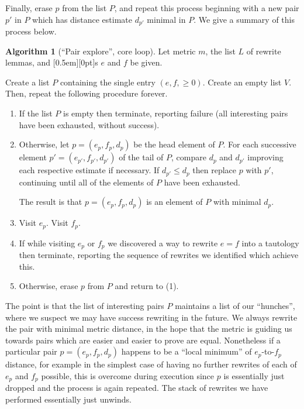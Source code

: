 \documentclass[a4paper]{article}
\theoremstyle{plain}
\theoremstyle{definition}
\newtheorem{alg}[theorem]{Algorithm}
\newcommand{\xx}[1]{{\colorbox{gray!15}{\raisebox{0em}[0.5em][0pt]{\makebox[\width-0.4em]{\texttt{#1}}}}}}
\newcommand{\expr}{\xx{expr}}
\begin{document}
Finally, erase $p$ from the list $P$, and repeat this process beginning with a new pair $p'$ in $P$ which has distance estimate $d_{p'}$ minimal in $P$. We give a summary of this process below.

\begin{alg}[``Pair explore'', core loop]
    \item Let metric $m$, the list $L$ of rewrite lemmas, and \expr{}s $e$ and $f$ be given.

    \item Create a list $P$ containing the single entry $(e, f, \geq 0)$. Create an empty list $V$. Then, repeat the following procedure forever.

    \begin{enumerate}[label={(\arabic*).}]
      \item If the list $P$ is empty then terminate, reporting failure (all interesting pairs have been exhausted, without success).

      \item Otherwise, let $p = (e_p, f_p, d_p)$ be the head element of $P$. For each successive element $p' = (e_{p'}, f_{p'}, d_{p'})$ of the tail of $P$, compare $d_{p}$ and $d_{p'}$ improving each respective estimate if necessary. If $d_{p'} \leq d_p$ then replace $p$ with $p'$, continuing until all of the elements of $P$ have been exhausted.

      The result is that $p = (e_p, f_p, d_p)$ is an element of $P$ with minimal $d_p$.

      \item Visit $e_p$. Visit $f_p$.

      \item If while visiting $e_p$ or $f_p$ we discovered a way to rewrite $e = f$ into a tautology then terminate, reporting the sequence of rewrites we identified which achieve this.

      \item Otherwise, erase $p$ from $P$ and return to (1).
  \end{enumerate}
\end{alg}

The point is that the list of interesting pairs $P$ maintains a list of our ``hunches'', where we suspect we may have success rewriting in the future. We always rewrite the pair with minimal metric distance, in the hope that the metric is guiding us towards pairs which are easier and easier to prove are equal. Nonetheless if a particular pair $p = (e_p, f_p, d_p)$ happens to be a ``local minimum'' of $e_p$-to-$f_p$ distance, for example in the simplest case of having no further rewrites of each of $e_p$ and $f_p$ possible, this is overcome during execution since $p$ is essentially just dropped and the process is again repeated. The stack of rewrites we have performed essentially just unwinds.
\end{document}
